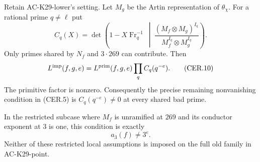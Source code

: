 \begin{proposition}
\label{AC-K29-bad}
Retain AC-K29-lower's setting.  Let $M_g$ be the Artin
representation of $\theta_\chi$.  For a rational prime
$q\ne\ell$ put
\[
 C_q(X)=\det\left(1-X\operatorname{Fr}_q^{-1}\ \middle|\
 \frac{(M_f\otimes M_g)^{I_q}}
                  {M_f^{I_q}\otimes M_g^{I_q}}\right).
                                                            \tag{CER.9}
\]
Only primes shared by $N_f$ and $3\cdot269$ can contribute.
Then
\[
 L^{\rm imp}(f,g,e)
     =L^{\rm prim}(f,g,e)\prod_q C_q(q^{-e}).
                                                            \tag{CER.10}
\]
The primitive factor is nonzero.  Consequently the precise
remaining nonvanishing condition in (CER.5) is
$C_q(q^{-e})\ne0$ at every shared bad prime.

In the restricted subcase where $M_f$ is unramified at
$269$ and its conductor exponent at $3$ is one, this
condition is exactly
\[
                    a_3(f)\ne3^e.                         \tag{CER.11}
\]
Neither of these restricted local assumptions is imposed on
the full old family in AC-K29-point.
\end{proposition}
